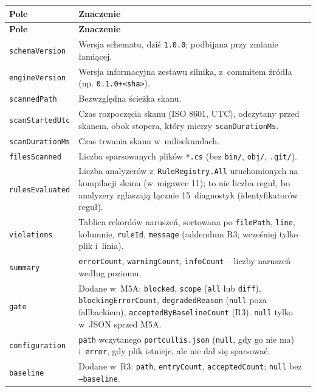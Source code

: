 \begin{xltabular}{\linewidth}{@{}>{\raggedright\arraybackslash}p{3.6cm} >{\raggedright\arraybackslash}X@{}}
\toprule
\textbf{Pole} & \textbf{Znaczenie} \\
\midrule
\endfirsthead
\toprule
\textbf{Pole} & \textbf{Znaczenie} \\
\midrule
\endhead
\texttt{schemaVersion} & Wersja schematu, dziś \texttt{1.0.0}; podbijana przy zmianie łamiącej. \\
\texttt{engineVersion} & Wersja informacyjna zestawu silnika, z~commitem źródła (np. \texttt{0.1.0+<sha>}). \\
\texttt{scannedPath} & Bezwzględna ścieżka skanu. \\
\texttt{scanStartedUtc} & Czas rozpoczęcia skanu (ISO 8601, UTC), odczytany przed skanem, obok stopera, który mierzy \texttt{scanDurationMs}. \\
\texttt{scanDurationMs} & Czas trwania skanu w~milisekundach. \\
\texttt{filesScanned} & Liczba sparsowanych plików \texttt{*.cs} (bez \texttt{bin/}, \texttt{obj/}, \texttt{.git/}). \\
\texttt{rulesEvaluated} & Liczba analyzerów z~\texttt{RuleRegistry.All} uruchomionych na kompilacji skanu (w~migawce 11); to nie liczba reguł, bo analyzery zgłaszają łącznie 15~diagnostyk (identyfikatorów reguł). \\
\texttt{violations} & Tablica rekordów naruszeń, sortowana po \texttt{filePath}, \texttt{line}, kolumnie, \texttt{ruleId}, \texttt{message} (addendum R3; wcześniej tylko plik i~linia). \\
\texttt{summary} & \texttt{errorCount}, \texttt{warningCount}, \texttt{infoCount} -- liczby naruszeń według poziomu. \\
\texttt{gate} & Dodane w~M5A: \texttt{blocked}, \texttt{scope} (\texttt{all} lub \texttt{diff}), \texttt{blockingErrorCount}, \texttt{degradedReason} (\texttt{null} poza fallbackiem), \texttt{acceptedByBaselineCount} (R3). \texttt{null} tylko w~JSON sprzed M5A. \\
\texttt{configuration} & \texttt{path} wczytanego \texttt{portcullis.json} (\texttt{null}, gdy go nie ma) i~\texttt{error}, gdy plik istnieje, ale nie dał się sparsować. \\
\texttt{baseline} & Dodane w~R3: \texttt{path}, \texttt{entryCount}, \texttt{acceptedCount}; \texttt{null} bez \texttt{--baseline}. \\
\bottomrule
\end{xltabular}

